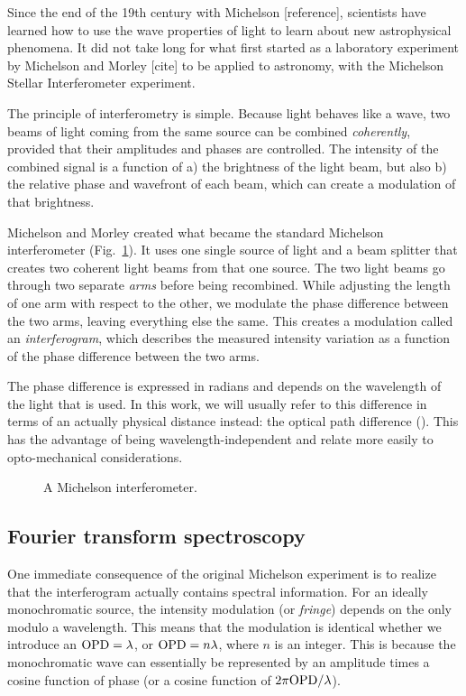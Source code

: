 Since the end of the 19th century with Michelson [reference], scientists have learned how to use the wave properties of light to learn about new astrophysical phenomena. It did not take long for what first started as a laboratory experiment by Michelson and Morley [cite] to be applied to astronomy, with the Michelson Stellar Interferometer experiment. 

The principle of interferometry is simple. Because light behaves like a wave, two beams of light coming from the same source can be combined \textit{coherently}, provided that their amplitudes and phases are controlled. The intensity of the combined signal is a function of a) the brightness of the light beam, but also b) the relative phase and wavefront of each beam, which can create a modulation of that brightness.

Michelson and Morley created what became the standard Michelson interferometer (Fig.~\ref{fig:michelson}). It uses one single source of light and a beam splitter that creates two coherent light beams from that one source. The two light beams go through two separate \textit{arms} before being recombined. While adjusting the length of one arm with respect to the other, we modulate the phase difference between the two arms, leaving everything else the same. This creates a modulation called an \textit{interferogram}, which describes the measured intensity variation as a function of the phase difference between the two arms.

The phase difference is expressed in radians and depends on the wavelength of the light that is used. In this work, we will usually refer to this difference in terms of an actually physical distance instead: the optical path difference (\OPD). This has the advantage of being wavelength-independent and relate more easily to opto-mechanical considerations.

\begin{figure}[!ht]
	\centering
	
	\caption[Michelson interferometer]{A Michelson interferometer.}
	\label{fig:michelson}
    \end{figure}



\subsection{Fourier transform spectroscopy}

One immediate consequence of the original Michelson experiment is to realize that the interferogram actually contains spectral information. For an ideally monochromatic source, the intensity modulation (or \textit{fringe}) depends on the \OPD only modulo a wavelength. This means that the modulation is identical whether we introduce an $\textrm{OPD} = \lambda$, or $\textrm{OPD} = n\lambda$, where $n$ is an integer. This is because the monochromatic wave can essentially be represented by an amplitude times a cosine function of phase (or a cosine function of $2\pi\textrm{OPD}/\lambda$).


